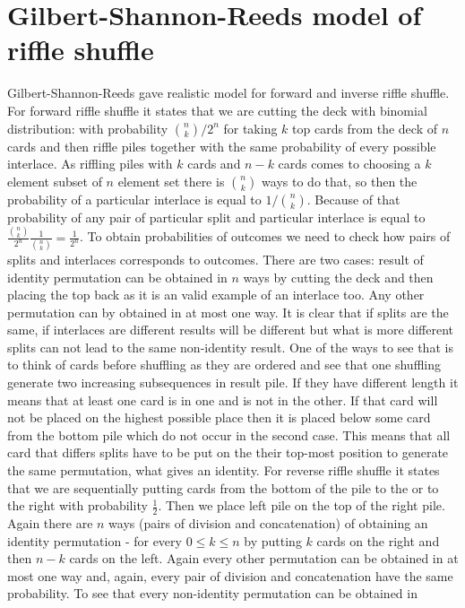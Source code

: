 \documentclass[a4paper, 12pt]{article}
\begin{document}
\section{Gilbert-Shannon-Reeds model of riffle shuffle}
Gilbert-Shannon-Reeds gave realistic model for forward and inverse riffle shuffle.
For forward riffle shuffle it states that we are cutting the deck with binomial distribution:
with probability $\binom{n}{k}/2^n$ for taking $k$ top cards from the deck of $n$ cards
and then riffle piles together with the same probability of every possible interlace. As riffling piles with
$k$ cards and $n-k$ cards comes to choosing a $k$ element subset of $n$ element set there is $\binom{n}{k}$
ways to do that, so then the probability of a particular interlace is equal to $1/\binom{n}{k}$.
Because of that probability of any pair of particular split and particular interlace is equal to
$\frac{\binom{n}{k}}{2^n}\frac{1}{\binom{n}{k}} = \frac{1}{2^n}$. To obtain probabilities of outcomes
we need to check how pairs of splits and interlaces corresponds to outcomes. There are two cases:
result of identity permutation can be obtained in $n$ ways by cutting the deck and then placing the top back
as it is an valid example of an interlace too. Any other permutation can by obtained in at most one way.
It is clear that if splits are the same, if interlaces are different results will be different but what is
more different splits can not lead to the same non-identity result. One of the ways to see that is to think
of cards before shuffling as they are ordered and see that one shuffling generate two increasing subsequences
in result pile. If they have different length it means that at least one card is in one and is not
in the other. If that card will not be placed on the highest possible place then it is placed below some
card from the bottom pile which do not occur in the second case. This means that all card that differs splits
have to be put on the their top-most position to generate the same permutation, what gives an identity.
For reverse riffle shuffle it states that we are sequentially putting cards from the bottom of the pile to
the or to the right with probability $\frac{1}{2}$. Then we place left pile on the top of the right pile.
Again there are $n$ ways (pairs of division and concatenation) of obtaining an identity permutation -
for every $0 \leq k \leq n$ by putting $k$ cards on the right and then $n-k$ cards on the left.
Again every other permutation can be obtained in at most one way and, again, every pair of division and
concatenation have the same probability. To see that every non-identity permutation can be obtained in
\end{document}
